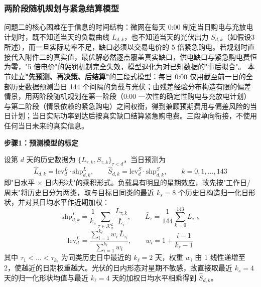 
\subsubsection{两阶段随机规划与紧急结算模型}

问题二的核心困难在于信息的时间结构：微网在每天 0:00 制定当日购电与充放电计划时，既不知道当天的负载曲线 $L_{d,k}$，也不知道当天的光伏出力 $S_{d,k}$（如假设3所述），而一旦实际功率不足，缺口必须以交易电价的 5 倍紧急购电。若规划时直接代入附件二的真实值，最优解必然逐点覆盖真实缺口，供电缺口与紧急购电费恒为零，"5 倍电价"的惩罚机制完全失效，模型退化为对已知数据的"事后拟合"。
本节建立\textbf{"先预测、再决策、后结算"}的三段式模型：每日 0:00 仅用截至前一日的全部历史数据预测当日 144 个间隔的负载与光伏；由残差经验分布构造有限的偏差情景，用两阶段随机规划在第一阶段（0:00 一次性的确定性购电与充放电计划）与第二阶段（情景依赖的紧急购电）之间权衡，得到兼顾预期费用与偏差风险的当日计划；当日实际功率到达后按真实缺口结算紧急购电费。三段单向衔接，不使用任何当日未来的真实信息。

\textbf{步骤1：预测模型的标定}

设第 $d$ 天的历史数据为 $\{L_{\tau,k},S_{\tau,k}\}_{\tau<d}$，当日预测为
\begin{equation}
    \hat L_{d,k}=\mathrm{lev}^{L}_{d}\cdot \mathrm{shp}^{L}_{d,k},\qquad
    \hat S_{d,k}=\mathrm{lev}^{S}_{d}\cdot \mathrm{shp}^{S}_{d,k},\qquad k=0,1,\dots,143
\end{equation}
即"日水平 $\times$ 日内形状"的乘积形式。负载具有明显的星期效应，故先按"工作日/周末"将历史日分为两类，取与目标日同类的最近 $k_s=8$ 个历史日构造归一化日形状，并对其日均水平作近期加权：
\begin{equation}
    \mathrm{shp}^{L}_{d,k}=\frac{1}{k_s}\sum_{\tau\in\mathcal{K}^{L}_{d}}
    \frac{L_{\tau,k}}{\bar L_{\tau}},\qquad
    \bar L_{\tau}=\frac{1}{144}\sum_{k=0}^{143}L_{\tau,k}
\end{equation}
\begin{equation}
    \mathrm{lev}^{L}_{d}=\frac{\sum_{i=1}^{k_\ell} w_i\,\bar L_{\tau_i}}{\sum_{i=1}^{k_\ell} w_i},
    \qquad w_i=1+\frac{i-1}{k_\ell-1}
\end{equation}
其中 $\tau_1<\dots<\tau_{k_\ell}$ 为同类历史日中最近的 $k_\ell=2$ 天，权重 $w_i$ 由 1 线性递增至 2，使越近的日期权重越大。光伏的日内形态对星期不敏感，故直接取最近 $k_s=4$ 天的归一化形状均值与最近 $k_\ell=4$ 天的加权日均水平相乘得到 $\hat S_{d,k}$。

